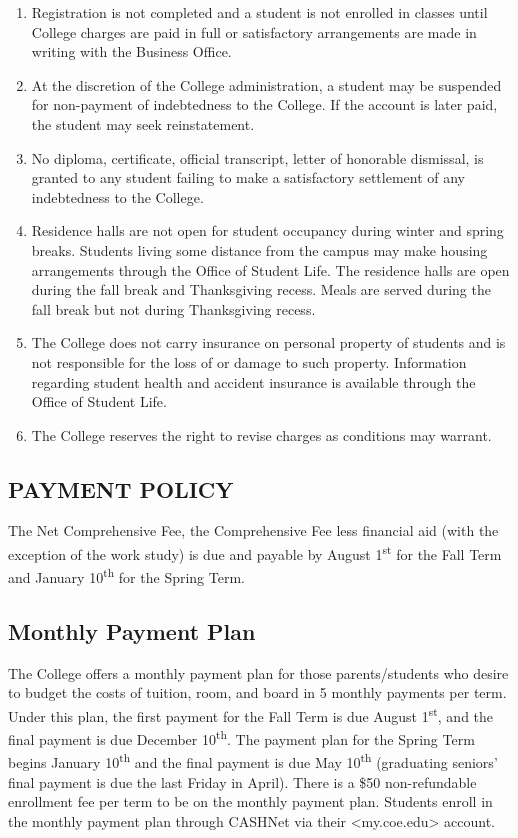 \documentclass[
  letterpaper,
]{scrbook}
\providecommand{\tightlist}{%
  \setlength{\itemsep}{0pt}\setlength{\parskip}{0pt}}
\begin{document}
\begin{enumerate}
\def\labelenumi{\arabic{enumi}.}
\tightlist
\item
  Registration is not completed and a student is not enrolled in classes
  until College charges are paid in full or satisfactory arrangements
  are made in writing with the Business Office.
\item
  At the discretion of the College administration, a student may be
  suspended for non-payment of indebtedness to the College. If the
  account is later paid, the student may seek reinstatement.
\item
  No diploma, certificate, official transcript, letter of honorable
  dismissal, is granted to any student failing to make a satisfactory
  settlement of any indebtedness to the College.
\item
  Residence halls are not open for student occupancy during winter and
  spring breaks. Students living some distance from the campus may make
  housing arrangements through the Office of Student Life. The residence
  halls are open during the fall break and Thanksgiving recess. Meals
  are served during the fall break but not during Thanksgiving recess.
\item
  The College does not carry insurance on personal property of students
  and is not responsible for the loss of or damage to such property.
  Information regarding student health and accident insurance is
  available through the Office of Student Life.
\item
  The College reserves the right to revise charges as conditions may
  warrant.
\end{enumerate}

\subsection{PAYMENT POLICY}\label{payment-policy}

The Net Comprehensive Fee, the Comprehensive Fee less financial aid
(with the exception of the work study) is due and payable by August
1\textsuperscript{st} for the Fall Term and January
10\textsuperscript{th} for the Spring Term.

\subsection{Monthly Payment Plan}\label{monthly-payment-plan}

The College offers a monthly payment plan for those parents/students who
desire to budget the costs of tuition, room, and board in 5 monthly
payments per term. Under this plan, the first payment for the Fall Term
is due August 1\textsuperscript{st}, and the final payment is due
December 10\textsuperscript{th}. The payment plan for the Spring Term
begins January 10\textsuperscript{th} and the final payment is due May
10\textsuperscript{th} (graduating seniors' final payment is due the
last Friday in April). There is a \$50 non-refundable enrollment fee per
term to be on the monthly payment plan. Students enroll in the monthly
payment plan through CASHNet via their
\textless my.coe.edu\textgreater{} account.
\end{document}

